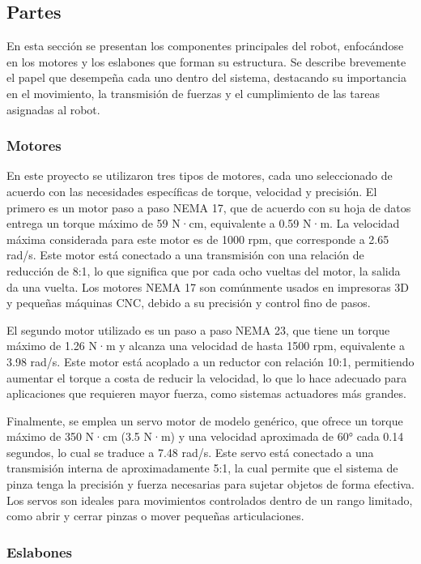\subsection{Partes} \label{subsec:partes}
En esta sección se presentan los componentes principales del robot, enfocándose en los motores y los eslabones que forman su estructura. Se describe brevemente el papel que desempeña cada uno dentro del sistema, destacando su importancia en el movimiento, la transmisión de fuerzas y el cumplimiento de las tareas asignadas al robot.


\subsubsection{Motores} \label{subsubsec:motores}

En este proyecto se utilizaron tres tipos de motores, cada uno seleccionado de acuerdo con las necesidades específicas de torque, velocidad y precisión. El primero es un motor paso a paso NEMA 17, que de acuerdo con su hoja de datos entrega un torque máximo de 59 N·cm, equivalente a 0.59 N·m. La velocidad máxima considerada para este motor es de 1000 rpm, que corresponde a 2.65 rad/s. Este motor está conectado a una transmisión con una relación de reducción de 8:1, lo que significa que por cada ocho vueltas del motor, la salida da una vuelta. Los motores NEMA 17 son comúnmente usados en impresoras 3D y pequeñas máquinas CNC, debido a su precisión y control fino de pasos.

El segundo motor utilizado es un paso a paso NEMA 23, que tiene un torque máximo de 1.26 N·m y alcanza una velocidad de hasta 1500 rpm, equivalente a 3.98 rad/s. Este motor está acoplado a un reductor con relación 10:1, permitiendo aumentar el torque a costa de reducir la velocidad, lo que lo hace adecuado para aplicaciones que requieren mayor fuerza, como sistemas actuadores más grandes.

Finalmente, se emplea un servo motor de modelo genérico, que ofrece un torque máximo de 350 N·cm (3.5 N·m) y una velocidad aproximada de 60° cada 0.14 segundos, lo cual se traduce a 7.48 rad/s. Este servo está conectado a una transmisión interna de aproximadamente 5:1, la cual permite que el sistema de pinza tenga la precisión y fuerza necesarias para sujetar objetos de forma efectiva. Los servos son ideales para movimientos controlados dentro de un rango limitado, como abrir y cerrar pinzas o mover pequeñas articulaciones.


\subsubsection{Eslabones} \label{subsubsec:eslabones}

